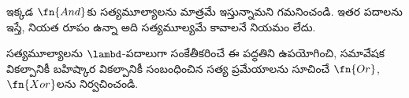 \documentclass[../../../include/open-logic-section]{subfiles}
\begin{document}
ఇక్కడ $\fn{And}$కు సత్యమూల్యాలను మాత్రమే ఇస్తున్నామని
గమనించండి. ఇతర పదాలను ఇస్తే, నియత రూపం ఉన్నా అది
సత్యమూల్యమే కావాలనే నియమం లేదు.

\begin{prob}
  సత్యమూల్యాలను $\lambd$-పదాలుగా సంకేతీకరించే ఈ పద్ధతిని
  ఉపయోగించి, సమావేషక వికల్పానికీ బహిష్కార వికల్పానికీ
  సంబంధించిన సత్య ప్రమేయాలను సూచించే $\fn{Or}$,
  $\fn{Xor}$లను నిర్వచించండి.
\end{prob}
\end{document}
